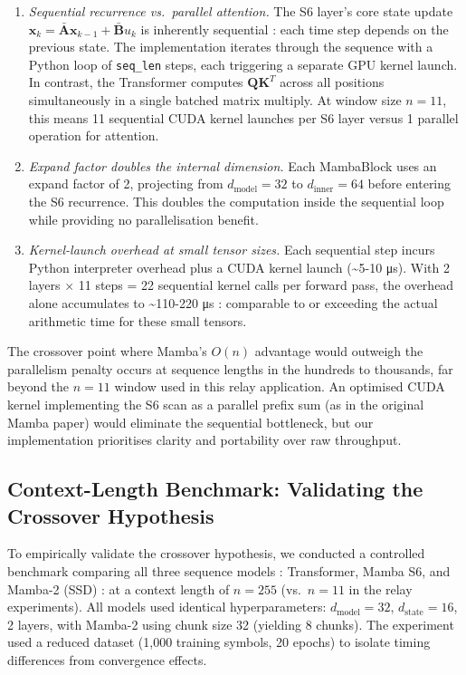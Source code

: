 \begin{enumerate}
\def\labelenumi{\arabic{enumi}.}
\item
  \emph{Sequential recurrence vs.~parallel attention.} The S6 layer's core state update \(\mathbf{x}_k = \bar{\mathbf{A}} \mathbf{x}_{k-1} + \bar{\mathbf{B}} u_k\) is inherently sequential : each time step depends on the previous state. The implementation iterates through the sequence with a Python loop of \texttt{seq\_len} steps, each triggering a separate GPU kernel launch. In contrast, the Transformer computes \(\mathbf{Q}\mathbf{K}^T\) across all positions simultaneously in a single batched matrix multiply. At window size \(n = 11\), this means 11 sequential CUDA kernel launches per S6 layer versus 1 parallel operation for attention.
\item
  \emph{Expand factor doubles the internal dimension.} Each MambaBlock uses an expand factor of 2, projecting from \(d_\text{model} = 32\) to \(d_\text{inner} = 64\) before entering the S6 recurrence. This doubles the computation inside the sequential loop while providing no parallelisation benefit.
\item
  \emph{Kernel-launch overhead at small tensor sizes.} Each sequential step incurs Python interpreter overhead plus a CUDA kernel launch (\textasciitilde5-10 μs). With 2 layers × 11 steps = 22 sequential kernel calls per forward pass, the overhead alone accumulates to \textasciitilde110-220 μs : comparable to or exceeding the actual arithmetic time for these small tensors.
\end{enumerate}

The crossover point where Mamba's \(O(n)\) advantage would outweigh the parallelism penalty occurs at sequence lengths in the hundreds to thousands, far beyond the \(n = 11\) window used in this relay application. An optimised CUDA kernel implementing the S6 scan as a parallel prefix sum (as in the original Mamba paper) would eliminate the sequential bottleneck, but our implementation prioritises clarity and portability over raw throughput.

\subsection{Context-Length Benchmark: Validating the Crossover Hypothesis}\label{sec:context-length-benchmark-validating-the-crossover-hypothesis}

To empirically validate the crossover hypothesis, we conducted a controlled benchmark comparing all three sequence models : Transformer, Mamba S6, and Mamba-2 (SSD) : at a context length of \(n = 255\) (vs.~\(n = 11\) in the relay experiments). All models used identical hyperparameters: \(d_{\text{model}} = 32\), \(d_{\text{state}} = 16\), 2 layers, with Mamba-2 using chunk size 32 (yielding 8 chunks). The experiment used a reduced dataset (1,000 training symbols, 20 epochs) to isolate timing differences from convergence effects.

